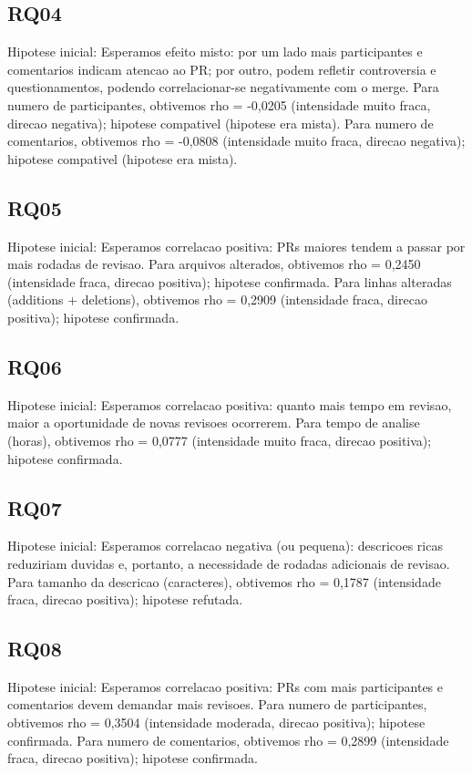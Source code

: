 \documentclass[11pt,a4paper]{article}
\begin{document}
\subsection*{RQ04}
Hipotese inicial: Esperamos efeito misto: por um lado mais participantes e comentarios indicam atencao ao PR; por outro, podem refletir controversia e questionamentos, podendo correlacionar-se negativamente com o merge. Para numero de participantes, obtivemos rho = -0,0205 (intensidade muito fraca, direcao negativa); hipotese compativel (hipotese era mista). Para numero de comentarios, obtivemos rho = -0,0808 (intensidade muito fraca, direcao negativa); hipotese compativel (hipotese era mista).

\subsection*{RQ05}
Hipotese inicial: Esperamos correlacao positiva: PRs maiores tendem a passar por mais rodadas de revisao. Para arquivos alterados, obtivemos rho = 0,2450 (intensidade fraca, direcao positiva); hipotese confirmada. Para linhas alteradas (additions + deletions), obtivemos rho = 0,2909 (intensidade fraca, direcao positiva); hipotese confirmada.

\subsection*{RQ06}
Hipotese inicial: Esperamos correlacao positiva: quanto mais tempo em revisao, maior a oportunidade de novas revisoes ocorrerem. Para tempo de analise (horas), obtivemos rho = 0,0777 (intensidade muito fraca, direcao positiva); hipotese confirmada.

\subsection*{RQ07}
Hipotese inicial: Esperamos correlacao negativa (ou pequena): descricoes ricas reduziriam duvidas e, portanto, a necessidade de rodadas adicionais de revisao. Para tamanho da descricao (caracteres), obtivemos rho = 0,1787 (intensidade fraca, direcao positiva); hipotese refutada.

\subsection*{RQ08}
Hipotese inicial: Esperamos correlacao positiva: PRs com mais participantes e comentarios devem demandar mais revisoes. Para numero de participantes, obtivemos rho = 0,3504 (intensidade moderada, direcao positiva); hipotese confirmada. Para numero de comentarios, obtivemos rho = 0,2899 (intensidade fraca, direcao positiva); hipotese confirmada.
\end{document}

